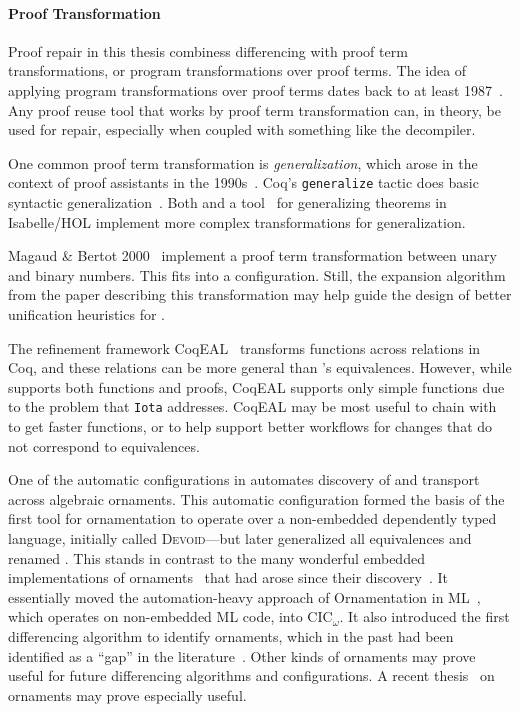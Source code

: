 \paragraph{Proof Transformation}
Proof repair in this thesis combiness differencing with proof term transformations, or program transformations over proof terms.
The idea of applying program transformations over proof terms dates back to at least 1987~\cite{pfenning}.
Any proof reuse tool that works by proof term transformation can, in theory, be used for repair,
especially when coupled with something like the \toolnamec decompiler.

One common proof term transformation is \textit{generalization}, which arose in the context of proof assistants
in the 1990s~\cite{hasker1992generalization, kolbe1998proof, pons1999conception}.
Coq's \lstinline{generalize} tactic does basic syntactic generalization~\cite{coq-tactics}.
Both \sysnamelong and a tool~\cite{Johnsen2004} for generalizing theorems in Isabelle/HOL
implement more complex transformations for generalization.

Magaud \& Bertot 2000~\cite{magaud2000changing} implement a proof term transformation between
unary and binary numbers. 
This fits into a \toolnamec configuration.
Still, the expansion algorithm from the paper describing this transformation may help guide the design
of better unification heuristics for \toolnamec.

The refinement framework CoqEAL~\cite{cohen:hal-01113453} transforms functions across relations in Coq,
and these relations can be more general than \toolnamec's equivalences.
However, while \toolnamec supports both functions and proofs, CoqEAL supports only simple functions
due to the problem that \lstinline{Iota} addresses.
CoqEAL may be most useful to chain with \toolnamec to get faster functions,
or to help support better workflows for changes that do not correspond to equivalences.

One of the automatic configurations in \toolnamec automates discovery of and transport across algebraic ornaments.
This automatic configuration formed the basis of the first tool for ornamentation to operate over a non-embedded dependently typed language,
initially called \textsc{Devoid}---but later generalized all equivalences and renamed \toolnamec.
This stands in contrast to the many wonderful embedded implementations of 
ornaments~\cite{Dagand:2013:CTO:2591370.2591396, ko2013relational, dagand2014transporting, ko2016programming, dagand2017essence}
that had arose since their discovery~\cite{mcbride}.
It essentially moved the automation-heavy approach of Ornamentation in ML~\cite{Williams2017},
which operates on non-embedded ML code, into CIC$_{\omega}$.
It also introduced the first differencing algorithm to identify ornaments, which in the past 
had been identified as a ``gap'' in the literature~\cite{ko2016programming}.
Other kinds of ornaments may prove useful for future \toolnamec differencing algorithms and configurations.
A recent thesis~\cite{williamsphd} on ornaments may prove especially useful.

